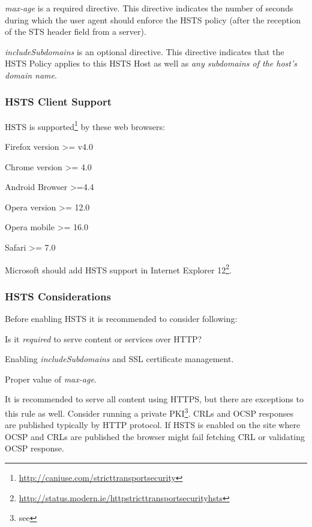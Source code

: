 \emph{max-age} is a required directive. This directive indicates the number of seconds during which the user agent should enforce the HSTS policy (after the reception of the STS header field from a server).

\emph{includeSubdomains} is an optional directive. This directive indicates that the HSTS Policy applies to this HSTS Host as well as \emph{any subdomains of the host's domain name}.

\subsubsection{HSTS Client Support}
\label{subsubsection:HSTS Client Support}
HSTS is supported\footnote{\url{http://caniuse.com/stricttransportsecurity}} by these web browsers:
\begin{itemize*}
  \item Firefox version >= v4.0
	\item Chrome version >= 4.0
	\item Android Browser >=4.4
	\item Opera version >= 12.0 
	\item Opera mobile >= 16.0
	\item Safari >= 7.0
\end{itemize*}
Microsoft should add HSTS support in Internet Explorer 12\footnote{\url{http://status.modern.ie/httpstricttransportsecurityhsts}}.

\subsubsection{HSTS Considerations}
\label{subsubsection:HSTS Considerations}
Before enabling HSTS it is recommended to consider following:
\begin{itemize*}
  \item Is it \emph{required} to serve content or services over HTTP?
	\item Enabling \emph{includeSubdomains} and SSL certificate management.
	\item Proper value of \emph{max-age}. 
\end{itemize*}

It is recommended to serve all content using HTTPS, but there are exceptions to this rule as well. Consider running a private PKI\footnote{see }. CRLs and OCSP responses are published typically by HTTP protocol. If HSTS is enabled on the site where OCSP and CRLs are published the browser might fail fetching CRL or validating OCSP response.

